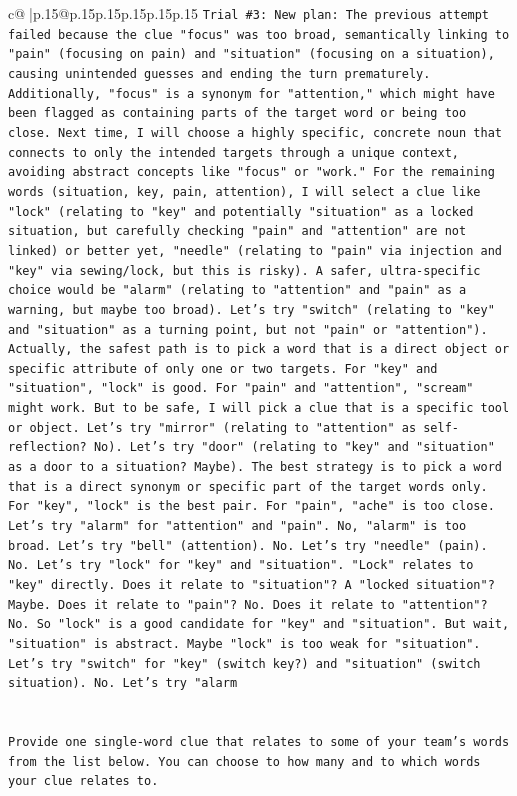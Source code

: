 \documentclass{article}
\begin{document}
{\begin{supertabular}{c@{$\;$}|p{.15\linewidth}@{}p{.15\linewidth}p{.15\linewidth}p{.15\linewidth}p{.15\linewidth}p{.15\linewidth}}
{{{\texttt{Trial \#3: New plan: The previous attempt failed because the clue "focus" was too broad, semantically linking to "pain" (focusing on pain) and "situation" (focusing on a situation), causing unintended guesses and ending the turn prematurely. Additionally, "focus" is a synonym for "attention," which might have been flagged as containing parts of the target word or being too close. Next time, I will choose a highly specific, concrete noun that connects to only the intended targets through a unique context, avoiding abstract concepts like "focus" or "work." For the remaining words (situation, key, pain, attention), I will select a clue like "lock" (relating to "key" and potentially "situation" as a locked situation, but carefully checking "pain" and "attention" are not linked) or better yet, "needle" (relating to "pain" via injection and "key" via sewing/lock, but this is risky). A safer, ultra{-}specific choice would be "alarm" (relating to "attention" and "pain" as a warning, but maybe too broad). Let's try "switch" (relating to "key" and "situation" as a turning point, but not "pain" or "attention"). Actually, the safest path is to pick a word that is a direct object or specific attribute of only one or two targets. For "key" and "situation", "lock" is good. For "pain" and "attention", "scream" might work. But to be safe, I will pick a clue that is a specific tool or object. Let's try "mirror" (relating to "attention" as self{-}reflection? No). Let's try "door" (relating to "key" and "situation" as a door to a situation? Maybe). The best strategy is to pick a word that is a direct synonym or specific part of the target words only. For "key", "lock" is the best pair. For "pain", "ache" is too close. Let's try "alarm" for "attention" and "pain". No, "alarm" is too broad. Let's try "bell" (attention). No. Let's try "needle" (pain). No. Let's try "lock" for "key" and "situation". "Lock" relates to "key" directly. Does it relate to "situation"? A "locked situation"? Maybe. Does it relate to "pain"? No. Does it relate to "attention"? No. So "lock" is a good candidate for "key" and "situation". But wait, "situation" is abstract. Maybe "lock" is too weak for "situation". Let's try "switch" for "key" (switch key?) and "situation" (switch situation). No. Let's try "alarm} \\
\\ 
\\ 
\texttt{Provide one single{-}word clue that relates to some of your team's words from the list below. You can choose to how many and to which words your clue relates to.} \\
}}}
\end{supertabular}}
\end{document}
